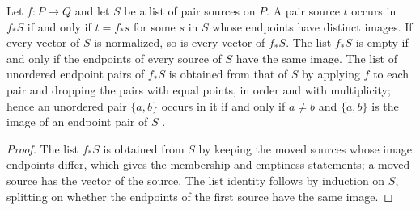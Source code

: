 \begin{theorem}
    \label{thm:party_owner_map}
    \leanok
    Let $f\colon P\to Q$ and let $S$ be a list of pair sources on $P$. A pair source
    $t$ occurs in $f_*S$ if and only if $t=f_*s$ for some $s$ in $S$ whose endpoints
    have distinct images. If every vector of $S$ is normalized, so is every vector
    of $f_*S$. The list $f_*S$ is empty if and only if the endpoints of every source
    of $S$ have the same image. The list of unordered endpoint pairs of $f_*S$ is
    obtained from that of $S$ by applying $f$ to each pair and dropping the pairs
    with equal points, in order and with multiplicity; hence an unordered pair
    $\{a,b\}$ occurs in it if and only if $a\neq b$ and $\{a,b\}$ is the image of an
    endpoint pair of $S$ \cite[Theorem~5.2]{OpenAI2026PolynomialPEPS}.
\end{theorem}
\begin{proof}\leanok
    The list $f_*S$ is obtained from $S$ by keeping the moved sources whose image
    endpoints differ, which gives the membership and emptiness statements; a moved
    source has the vector of the source. The list identity follows by induction on
    $S$, splitting on whether the endpoints of the first source have the same image.
\end{proof}

